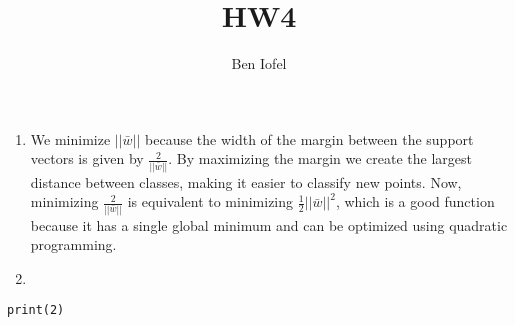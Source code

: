 \documentclass[11pt]{article}
\author{Ben Iofel}
\date{}
\title{HW4}
\begin{document}
\maketitle
\begin{enumerate}
\item We minimize \(||\bar{w}||\) because the width of the margin between the support vectors is given by \(\frac{2}{||\bar{w}||}\). By maximizing the margin we create the largest distance between classes, making it easier to classify new points. Now, minimizing \(\frac{2}{||\bar{w}||}\) is equivalent to minimizing \(\frac{1}{2}||\bar{w}||^2\), which is a good function because it has a single global minimum and can be optimized using quadratic programming.
\item 
\end{enumerate}
\begin{verbatim}
print(2)
\end{verbatim}
\end{document}
